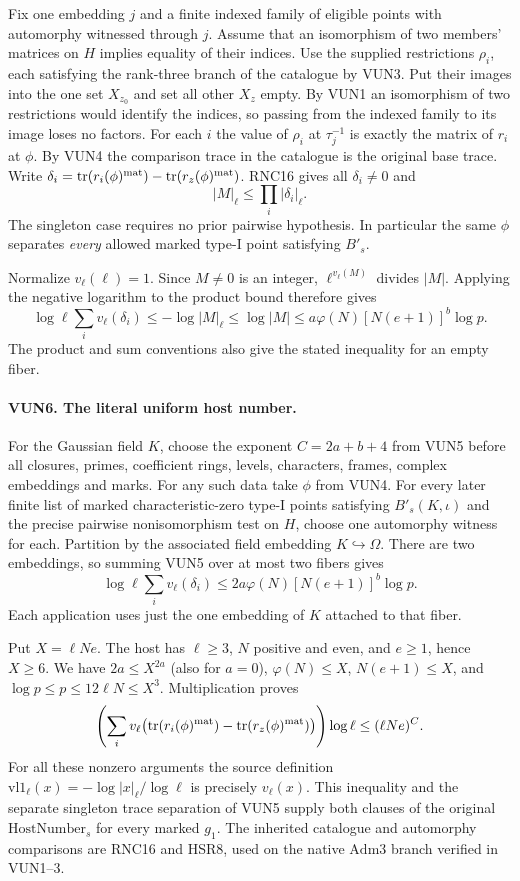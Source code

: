 Fix one embedding $j$ and a finite indexed family of eligible
points with automorphy witnessed through $j$. Assume that an
isomorphism of two members' matrices on $H$ implies equality
of their indices. Use the supplied restrictions $\rho_i$,
each satisfying the rank-three branch of the catalogue by VUN3.
Put their images into the one set $X_{z_0}$ and set all other
$X_z$ empty. By VUN1 an isomorphism of two restrictions would
identify the indices, so passing from the indexed family to its
image loses no factors. For each $i$ the value of $\rho_i$ at
$\tau_j^{-1}$ is exactly the matrix of $r_i$ at $\phi$.
By VUN4 the comparison trace in the catalogue is the original
base trace. Write $\delta_i=\operatorname{tr}(r_i(\phi)^{\rm mat})-
\operatorname{tr}(r_z(\phi)^{\rm mat})$. RNC16 gives all
$\delta_i\ne0$ and
\[
                |M|_\ell\le\prod_i|\delta_i|_\ell .
\]
The singleton case requires no prior pairwise hypothesis. In
particular the same $\phi$ separates \emph{every} allowed marked
type-I point satisfying $B'_s$.

Normalize $v_\ell(\ell)=1$. Since $M\ne0$ is an integer,
$\ell^{v_\ell(M)}$ divides $|M|$. Applying the negative
logarithm to the product bound therefore gives
\[
 \log\ell\sum_i v_\ell(\delta_i)
    \le -\log|M|_\ell
    \le \log |M|
    \le a\varphi(N)[N(e+1)]^b\log p.
\]
The product and sum conventions also give the stated inequality
for an empty fiber.

\paragraph{VUN6. The literal uniform host number.}
\label{claim:VUN6}
For the Gaussian field $K$, choose the exponent
$C=2a+b+4$ from VUN5 before all closures, primes, coefficient
rings, levels, characters, frames, complex embeddings and marks.
For any such data take $\phi$ from VUN4. For every later finite
list of marked characteristic-zero type-I points satisfying
$B'_s(K,\iota)$ and the precise pairwise nonisomorphism test
on $H$, choose one automorphy witness for each. Partition by the
associated field embedding $K\hookrightarrow\Omega$. There are
two embeddings, so summing VUN5 over at most two fibers gives
\[
             \log\ell\sum_i v_\ell(\delta_i)
               \le 2a\varphi(N)[N(e+1)]^b\log p .
\]
Each application uses just the one embedding of $K$ attached
to that fiber.

Put $X=\ell N e$. The host has $\ell\ge3$, $N$ positive and
even, and $e\ge1$, hence $X\ge6$. We have $2a\le X^{2a}$
(also for $a=0$), $\varphi(N)\le X$, $N(e+1)\le X$, and
$\log p\le p\le12\ell N\le X^3$. Multiplication proves
\[
  \left(\sum_i v_\ell\bigl(
     \operatorname{tr}(r_i(\phi)^{\rm mat})
      -\operatorname{tr}(r_z(\phi)^{\rm mat})\bigr)\right)\log\ell
       \le (\ell N e)^C .
\]
For all these nonzero arguments the source definition
$\mathrm{vl1}_\ell(x)=-\log|x|_\ell/\log\ell$ is precisely
$v_\ell(x)$. This inequality and the separate singleton trace
separation of VUN5 supply both clauses of the original
$\mathrm{HostNumber}_s$ for every marked $g_1$. The inherited
catalogue and automorphy comparisons are RNC16 and HSR8, used
on the native $\mathrm{Adm3}$ branch verified in VUN1--3.
